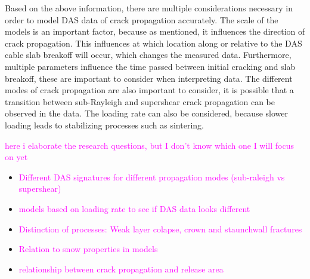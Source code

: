 \documentclass[10pt]{article}
\begin{document}
  
  Based on the above information, there are multiple considerations necessary in order to model DAS data of crack propagation accurately. The scale of the models is an important factor, because as mentioned, it influences the direction of crack propagation. This influences at which location along or relative to the DAS cable slab breakoff will occur, which changes the measured data. Furthermore, multiple parameters influence the time passed between initial cracking and slab breakoff, these are important to consider when interpreting data. The different modes of crack propagation are also important to consider, it is possible that a transition between sub-Rayleigh and supershear crack propagation can be observed in the data. The loading rate can also be considered, because slower loading leads to stabilizing processes such as sintering. \par

  \textcolor{magenta}{here i elaborate the research questions, but I don't know which one I will focus on yet} 

  \begin{itemize}
      \item \textcolor{magenta}{Different DAS signatures for different propagation modes (sub-raleigh vs supershear)}
      \item \textcolor{magenta}{models based on loading rate to see if DAS data looks different}
      \item \textcolor{magenta}{Distinction of processes: Weak layer colapse, crown and staunchwall fractures}
      \item \textcolor{magenta}{Relation to snow properties in models}
      \item \textcolor{magenta}{relationship between crack propagation and release area}
  \end{itemize}

\end{document}
